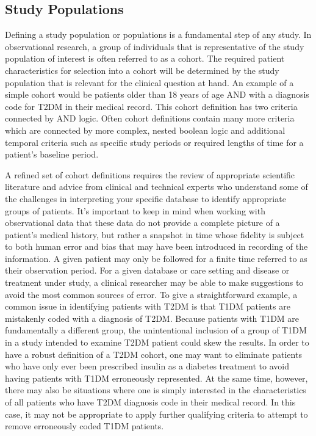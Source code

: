 \documentclass[11pt]{book}
\theoremstyle{definition}
\theoremstyle{definition}
\theoremstyle{definition}
\theoremstyle{remark}
\begin{document}
\hypertarget{study-populations}{%
\subsection{Study Populations}\label{study-populations}}

Defining a study population or populations is a fundamental step of any study. In observational research, a group of individuals that is representative of the study population of interest is often referred to as a cohort. The required patient characteristics for selection into a cohort will be determined by the study population that is relevant for the clinical question at hand. An example of a simple cohort would be patients older than 18 years of age AND with a diagnosis code for T2DM in their medical record. This cohort definition has two criteria connected by AND logic. Often cohort definitions contain many more criteria which are connected by more complex, nested boolean logic and additional temporal criteria such as specific study periods or required lengths of time for a patient's baseline period.

A refined set of cohort definitions requires the review of appropriate scientific literature and advice from clinical and technical experts who understand some of the challenges in interpreting your specific database to identify appropriate groups of patients. It's important to keep in mind when working with observational data that these data do not provide a complete picture of a patient's medical history, but rather a snapshot in time whose fidelity is subject to both human error and bias that may have been introduced in recording of the information. A given patient may only be followed for a finite time referred to as their observation period. For a given database or care setting and disease or treatment under study, a clinical researcher may be able to make suggestions to avoid the most common sources of error. To give a straightforward example, a common issue in identifying patients with T2DM is that T1DM patients are mistakenly coded with a diagnosis of T2DM. Because patients with T1DM are fundamentally a different group, the unintentional inclusion of a group of T1DM in a study intended to examine T2DM patient could skew the results. In order to have a robust definition of a T2DM cohort, one may want to eliminate patients who have only ever been prescribed insulin as a diabetes treatment to avoid having patients with T1DM erroneously represented. At the same time, however, there may also be situations where one is simply interested in the characteristics of all patients who have T2DM diagnosis code in their medical record. In this case, it may not be appropriate to apply further qualifying criteria to attempt to remove erroneously coded T1DM patients.
\end{document}
